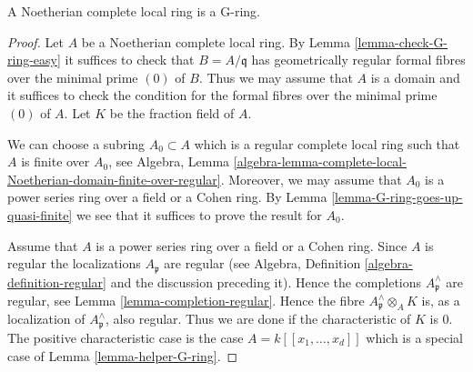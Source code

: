 \begin{proposition}
\label{proposition-Noetherian-complete-G-ring}
A Noetherian complete local ring is a G-ring.
\end{proposition}

\begin{proof}
Let $A$ be a Noetherian complete local ring. By
Lemma \ref{lemma-check-G-ring-easy}
it suffices to check that $B = A/\mathfrak q$ has geometrically regular
formal fibres over the minimal prime $(0)$ of $B$. Thus we may assume
that $A$ is a domain and it suffices to check the condition for
the formal fibres over the minimal prime $(0)$ of $A$.
Let $K$ be the fraction field of $A$.

\medskip\noindent
We can choose a subring $A_0 \subset A$ which is a regular complete local
ring such that $A$ is finite over $A_0$, see Algebra, Lemma
\ref{algebra-lemma-complete-local-Noetherian-domain-finite-over-regular}.
Moreover, we may assume that $A_0$ is a power series ring over a
field or a Cohen ring. By Lemma \ref{lemma-G-ring-goes-up-quasi-finite}
we see that it suffices to prove the result for $A_0$.

\medskip\noindent
Assume that $A$ is a power series ring over a field or a Cohen ring.
Since $A$ is regular the localizations $A_\mathfrak p$ are regular
(see Algebra, Definition \ref{algebra-definition-regular} and the
discussion preceding it).
Hence the completions $A_\mathfrak p^\wedge$ are regular, see
Lemma \ref{lemma-completion-regular}.
Hence the fibre $A_{\mathfrak p}^\wedge \otimes_A K$ is, as a localization
of $A_\mathfrak p^\wedge$, also regular. Thus we are done if the
characteristic of $K$ is $0$. The positive characteristic case
is the case $A = k[[x_1, \ldots, x_d]]$ which is a special case of
Lemma \ref{lemma-helper-G-ring}.
\end{proof}